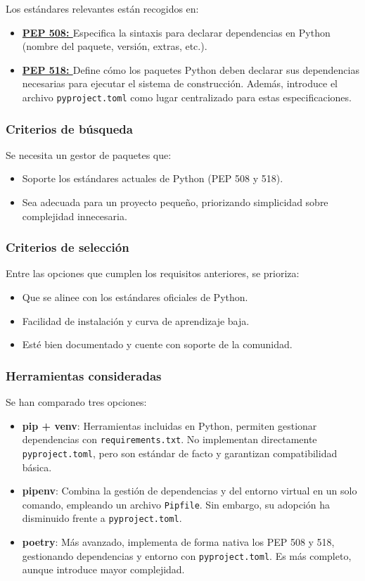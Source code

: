 Los estándares relevantes están recogidos en:
\begin{itemize}
    \item \textbf{\href{https://peps.python.org/pep-0508/}{PEP 508: }} Especifica la sintaxis 
    para declarar dependencias en Python (nombre del paquete, versión, extras, etc.).
    \item \textbf{\href{https://peps.python.org/pep-0518/}{PEP 518: }} Define cómo los paquetes 
    Python deben declarar sus dependencias necesarias para ejecutar el sistema de construcción. 
    Además, introduce el archivo \texttt{pyproject.toml} como lugar centralizado para estas especificaciones.
\end{itemize}

\subsubsection{Criterios de búsqueda}
Se necesita un gestor de paquetes que:
\begin{itemize}
    \item Soporte los estándares actuales de Python (PEP 508 y 518).
    \item Sea adecuada para un proyecto pequeño, priorizando simplicidad sobre complejidad 
    innecesaria.
\end{itemize}

\subsubsection{Criterios de selección}
Entre las opciones que cumplen los requisitos anteriores, se prioriza:
\begin{itemize}
    \item Que se alinee con los estándares oficiales de Python.
    \item Facilidad de instalación y curva de aprendizaje baja.
    \item Esté bien documentado y cuente con soporte de la comunidad.
\end{itemize}

\subsubsection{Herramientas consideradas}
Se han comparado tres opciones:
\begin{itemize}
    \item \textbf{pip + venv}: Herramientas incluidas en Python, permiten gestionar dependencias 
    con \texttt{requirements.txt}. No implementan directamente \texttt{pyproject.toml}, pero son 
    estándar de facto y garantizan compatibilidad básica.
    \item \textbf{pipenv}: Combina la gestión de dependencias y del entorno virtual en un solo
    comando, empleando un archivo \texttt{Pipfile}. Sin embargo, su adopción ha disminuido frente 
    a \texttt{pyproject.toml}.
    \item \textbf{poetry}: Más avanzado, implementa de forma nativa los PEP 508 y 518, gestionando
    dependencias y entorno con \texttt{pyproject.toml}. Es más completo, aunque introduce mayor 
    complejidad.
\end{itemize}

